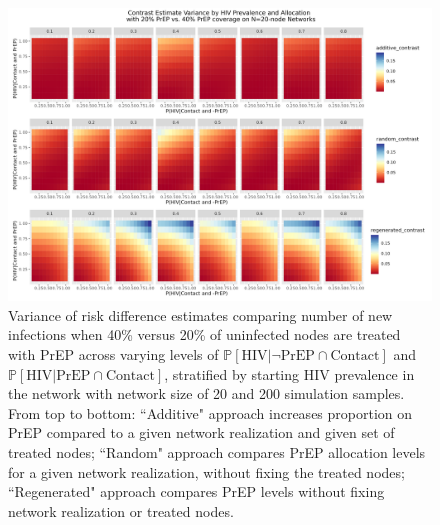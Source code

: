 \documentclass{article}
\theoremstyle{definition}
\begin{document}
\begin{figure}[H]
    \centering
    \includegraphics[width=\linewidth]{Corrected Figures/HIV Prevalence Variance Plot.png}
    \caption{Variance of risk difference estimates comparing number of new infections when 40\% versus 20\% of uninfected nodes are treated with PrEP across varying levels of $\mathbb{P}\left[\text{HIV} \vert \neg \text{PrEP} \cap \text{Contact}\right]$ and $\mathbb{P}\left[\text{HIV} \vert \text{PrEP} \cap \text{Contact}\right]$, stratified by starting HIV prevalence in the network with network size of 20 and 200 simulation samples.
    From top to bottom: ``Additive" approach increases proportion on PrEP compared to a given network realization and given set of treated nodes; ``Random" approach compares PrEP allocation levels for a given network realization, without fixing the treated nodes; ``Regenerated" approach compares PrEP levels without fixing network realization or treated nodes.}
    \label{fig:Figure 9}
\end{figure}
\end{document}
